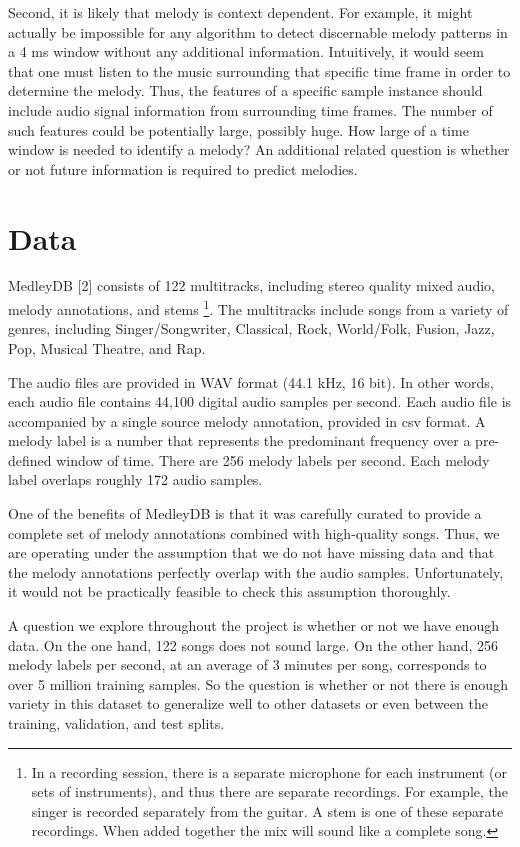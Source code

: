 \documentclass{article} %
\begin{document}
Second, it is likely that melody is context dependent.  For example, it might actually be impossible for any algorithm to detect discernable melody patterns in a 4 ms window without any additional information.  Intuitively, it would seem that one must listen to the music surrounding that specific time frame in order to determine the melody.  Thus, the features of a specific sample instance should include audio signal information from surrounding time frames.  The number of such features could be potentially large, possibly huge.  How large of a time window is needed to identify a melody?  An additional related question is whether or not future information is required to predict melodies.

\section{Data} \label{sec:data}

MedleyDB [2] consists of 122 multitracks, including stereo quality mixed audio, melody annotations, and stems \footnote{In a recording session, there is a separate microphone for each instrument (or sets of instruments), and thus there are separate recordings.  For example, the singer is recorded separately from the guitar.  A stem is one of these separate recordings.  When added together the mix will sound like a complete song.}.  The multitracks include songs from a variety of genres, including Singer/Songwriter, Classical, Rock, World/Folk, Fusion, Jazz, Pop, Musical Theatre, and Rap.

The audio files are provided in WAV format (44.1 kHz, 16 bit).  In other words, each audio file contains 44,100 digital audio samples per second.  Each audio file is accompanied by a single source melody annotation, provided in csv format.  A melody label is a number that represents the predominant frequency over a pre-defined window of time.  There are 256 melody labels per second.  Each melody label overlaps roughly 172 audio samples.

One of the benefits of MedleyDB is that it was carefully curated to provide a complete set of melody annotations combined with high-quality songs.  Thus, we are operating under the assumption that we do not have missing data and that the melody annotations perfectly overlap with the audio samples.  Unfortunately, it would not be practically feasible to check this assumption thoroughly.

A question we explore throughout the project is whether or not we have enough data.  On the one hand, 122 songs does not sound large.  On the other hand, 256 melody labels per second, at an average of 3 minutes per song, corresponds to over 5 million training samples.  So the question is whether or not there is enough variety in this dataset to generalize well to other datasets or even between the training, validation, and test splits.
\end{document}
